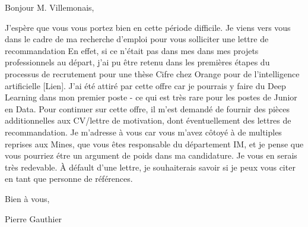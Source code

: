 Bonjour M. Villemonais,

J'espère que vous vous portez bien en cette période difficile. Je viens vers vous dans le cadre de ma recherche d'emploi pour vous solliciter une lettre de recommandation
En effet, si ce n'était pas dans mes dans mes projets professionnels au départ, j'ai pu être retenu dans les premières étapes du processus de recrutement pour une thèse Cifre chez Orange pour de l'intelligence artificielle  [Lien].
J'ai été attiré par cette offre car je pourrais y faire du Deep Learning dans mon premier poste - ce qui est très rare pour les postes de Junior en Data.
Pour continuer sur cette offre, il m'est demandé de fournir des pièces additionnelles aux CV/lettre de motivation, dont éventuellement des lettres de recommandation.
Je m'adresse à vous car vous m'avez côtoyé à de multiples reprises aux Mines, que vous êtes responsable du département IM, et je pense que vous pourriez étre un argument de poids dans ma candidature.
Je vous en serais très redevable.
À défault d'une lettre, je souhaiterais savoir si je peux vous citer en tant que personne de références.

Bien à vous,

Pierre Gauthier







